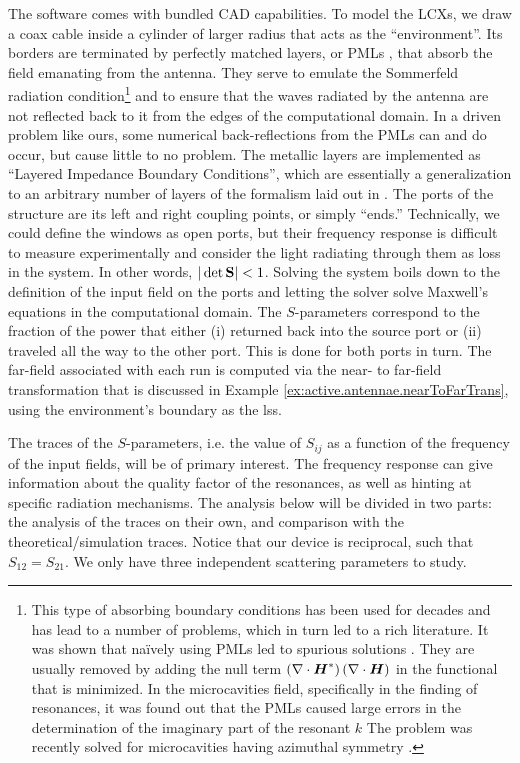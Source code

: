 The software comes with bundled CAD capabilities. To model the LCXs, we draw a coax 
cable inside a cylinder of larger radius that acts as the ``environment''. Its borders are
terminated by perfectly matched layers, or PMLs \cite{BER1994}, that absorb the field emanating 
from the antenna. They serve to emulate the Sommerfeld radiation condition\footnote{
This type of absorbing boundary conditions has been used for decades and has lead
to a number of problems, which in turn led to a rich literature. It was shown that naïvely using 
PMLs led to spurious solutions \cite{KON1976,KOS1984,KOS1985}. They are usually removed by
adding the null term $\left(\nabla\cdot\boldsymbol{H}^*\right)\left(\nabla\cdot\boldsymbol{H}\right)$
in the functional that is minimized.
In the microcavities field, specifically in the finding of resonances, it was 
found out that the PMLs caused large errors in the determination of the
imaginary part of the resonant $k$ \cite{HOW1993,HOE1998,BOR2004} The problem
was recently solved for microcavities having azimuthal symmetry \cite{OXB2007,CHE2013}.}
and to ensure that the waves radiated by the antenna are not reflected back to it
from the edges of the computational domain. In a driven problem like ours, some
numerical back-reflections from the PMLs can and do occur, but cause little
to no problem. The metallic layers are implemented as ``Layered Impedance Boundary
Conditions'', which are essentially a generalization to an arbitrary number of
layers of the formalism laid out in \cite{MIT1968}. The ports of the structure
are its left and right coupling points, or simply ``ends.'' Technically, we could
define the windows as open ports, but their frequency response is difficult to 
measure experimentally and consider the light radiating through them as loss 
in the system. In other words, $|\det\mathbf{S}|<1$. Solving the system boils down
to the definition of the input field on the ports and letting the solver solve
Maxwell's equations in the computational domain. The $S$-parameters correspond
to the fraction of the power that either (i) returned back into the source port
or (ii) traveled all the way to the other port. This is done for both ports in turn. 
The far-field associated with each run is computed via the near- to far-field 
transformation that is discussed in Example \ref{ex:active.antennae.nearToFarTrans}, 
using the environment's boundary as the \gls{lss}.

The traces of the $S$-parameters, i.e. the value of $S_{ij}$ as a function of 
the frequency of the input fields, will be of primary interest. The frequency
response can give information about the quality factor of the resonances, as well as
hinting at specific radiation mechanisms. The analysis below will be divided
in two parts: the analysis of the traces on their own, and comparison with the 
theoretical/simulation traces. Notice that our device is reciprocal, such that
$S_{12}=S_{21}$. We only have three independent scattering parameters to study.

